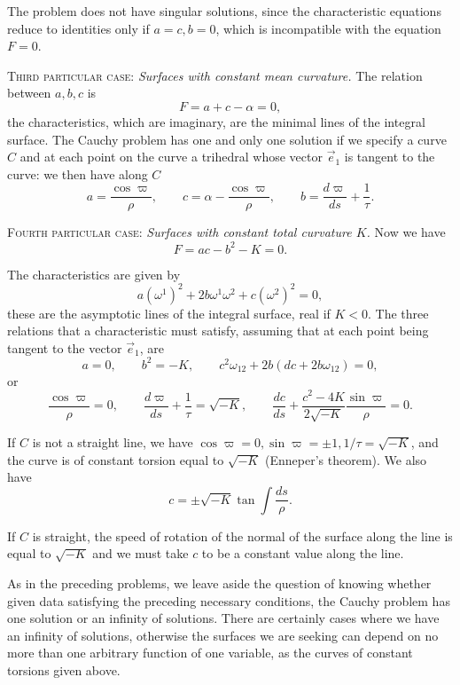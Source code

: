 \documentclass[leqno,11pt]{book}
\numberwithin{equation}{chapter}
\theoremstyle{shape1}
\theoremstyle{shape0}
\theoremstyle{shape2}
\theoremstyle{definition}
\begin{document}
The problem does not have singular solutions, since the characteristic equations reduce to identities only if $a=c,b=0$, which is incompatible with the equation $F=0$.



\vspace{12pt}\fsec \textsc{Third particular case:} \emph{Surfaces with constant mean curvature.} The relation between $a, b, c$ is
\[
F=a+c-\alpha=0,
\]
the characteristics, which are imaginary, are the minimal lines of the integral surface. The Cauchy problem has one and only one solution if we specify a curve $C$ and at each point on the curve a trihedral whose vector $\vec e_{1}$ is tangent to the curve: we then have along $C$
\[
a=\frac{\cos\varpi}{\rho},\qquad c=\alpha-\frac{\cos\varpi}{\rho},\qquad b=\frac{d\varpi}{ds}+\frac{1}{\tau}.
\]



\vspace{12pt}\fsec \textsc{Fourth particular case:} \emph{Surfaces with constant total curvature $K$.} Now we have
\[
F=ac-b^{2}-K=0.
\]

The characteristics are given by
\[
a(\omega^{1})^{2}+2b\omega^{1}\omega^{2}+c(\omega^{2})^{2}=0,
\]
these are the asymptotic lines of the integral surface, real if $K<0$. The three relations that a characteristic must satisfy, assuming that at each point being tangent to the vector $\vec e_{1}$, are
\[
a=0,\qquad b^{2}=-K,\qquad c^{2}\omega_{12}+2b(dc+2b\omega_{12})=0,
\]
or
\[
\frac{\cos\varpi}{\rho}=0,\qquad\frac{d\varpi}{ds}+\frac{1}{\tau}=\sqrt{-K},\qquad \frac{dc}{ds}+\frac{c^{2}-4K}{2\sqrt{-K}}\frac{\sin\varpi}{\rho}=0.
\]

If $C$ is not a straight line, we have $\cos\varpi=0, \sin\varpi=\pm 1, 1/\tau=\sqrt{-K}$, and the curve is of constant torsion equal to $\sqrt{-K}$ (Enneper's theorem). We also have
\[
c=\pm\sqrt{-K}\tan\int\frac{ds}{\rho}.
\]

If $C$ is straight, the speed of rotation of the normal of the surface along the line is equal to $\sqrt{-K}$ and we must take $c$ to be a constant value along the line.

As in the preceding problems, we leave aside the question of knowing whether given data satisfying the preceding necessary conditions, the Cauchy problem has one solution or an infinity of solutions. There are certainly cases where we have an infinity of solutions, otherwise the surfaces we are seeking can depend on no more than one arbitrary function of one variable, as the curves of constant torsions given above.
\end{document}
